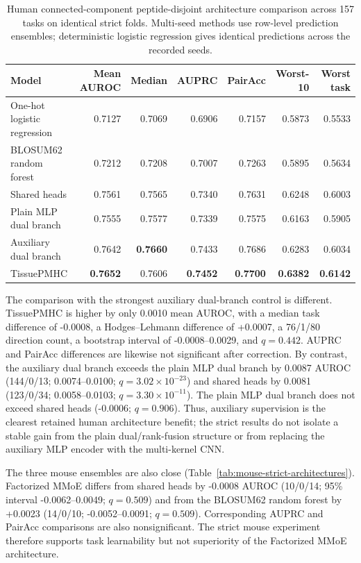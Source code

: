 \begin{table}[tbp]
\centering
\caption{Human connected-component peptide-disjoint architecture comparison across 157 tasks on identical strict folds. Multi-seed methods use row-level prediction ensembles; deterministic logistic regression gives identical predictions across the recorded seeds.}
\label{tab:human-strict-architectures}
\scriptsize
\setlength{\tabcolsep}{2pt}
\begin{tabular}{lrrrrrr}
\toprule
Model & Mean AUROC & Median & AUPRC & PairAcc & Worst-10 & Worst task \\
\midrule
One-hot logistic regression & 0.7127 & 0.7069 & 0.6906 & 0.7157 & 0.5873 & 0.5533 \\
BLOSUM62 random forest & 0.7212 & 0.7208 & 0.7007 & 0.7263 & 0.5895 & 0.5634 \\
Shared heads & 0.7561 & 0.7565 & 0.7340 & 0.7631 & 0.6248 & 0.6003 \\
Plain MLP dual branch & 0.7555 & 0.7577 & 0.7339 & 0.7575 & 0.6163 & 0.5905 \\
Auxiliary dual branch & 0.7642 & \textbf{0.7660} & 0.7433 & 0.7686 & 0.6283 & 0.6034 \\
TissuePMHC & \textbf{0.7652} & 0.7606 & \textbf{0.7452} & \textbf{0.7700} & \textbf{0.6382} & \textbf{0.6142} \\
\bottomrule
\end{tabular}
\end{table}

The comparison with the strongest auxiliary dual-branch control is different. TissuePMHC is higher by only 0.0010 mean AUROC, with a median task difference of -0.0008, a Hodges--Lehmann difference of +0.0007, a 76/1/80 direction count, a bootstrap interval of -0.0008--0.0029, and \(q=0.442\). AUPRC and PairAcc differences are likewise not significant after correction. By contrast, the auxiliary dual branch exceeds the plain MLP dual branch by 0.0087 AUROC (144/0/13; 0.0074--0.0100; \(q=3.02\times10^{-23}\)) and shared heads by 0.0081 (123/0/34; 0.0058--0.0103; \(q=3.30\times10^{-11}\)). The plain MLP dual branch does not exceed shared heads (-0.0006; \(q=0.906\)). Thus, auxiliary supervision is the clearest retained human architecture benefit; the strict results do not isolate a stable gain from the plain dual/rank-fusion structure or from replacing the auxiliary MLP encoder with the multi-kernel CNN.

The three mouse ensembles are also close (Table~\ref{tab:mouse-strict-architectures}). Factorized MMoE differs from shared heads by -0.0008 AUROC (10/0/14; 95\% interval -0.0062--0.0049; \(q=0.509\)) and from the BLOSUM62 random forest by +0.0023 (14/0/10; -0.0052--0.0091; \(q=0.509\)). Corresponding AUPRC and PairAcc comparisons are also nonsignificant. The strict mouse experiment therefore supports task learnability but not superiority of the Factorized MMoE architecture.

